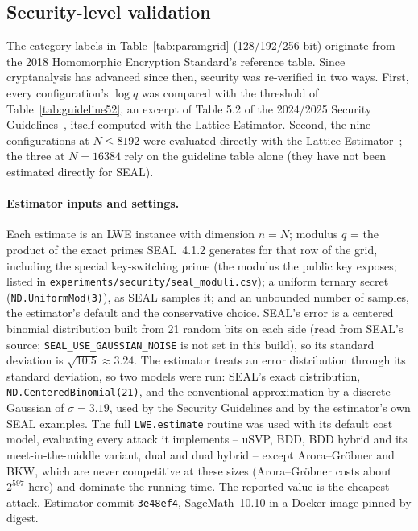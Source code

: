 \subsection{Security-level validation}
\label{sec:security-validation}

The category labels in Table~\ref{tab:paramgrid} (128/192/256-bit) originate from the 2018 Homomorphic Encryption Standard's reference table. Since cryptanalysis has advanced since then, security was re-verified in two ways. First, every configuration's $\log q$ was compared with the threshold of Table~\ref{tab:guideline52}, an excerpt of Table 5.2 of the 2024/2025 Security Guidelines~\cite{bossuat2024}, itself computed with the Lattice Estimator. Second, the nine configurations at $N \le 8192$ were evaluated directly with the Lattice Estimator~\cite{albrecht2015estimator}; the three at $N{=}16384$ rely on the guideline table alone (they have not been estimated directly for SEAL).

\paragraph{Estimator inputs and settings.}\sloppy{} Each estimate is an LWE instance with dimension $n = N$; modulus $q$ = the product of the exact primes SEAL~4.1.2 generates for that row of the grid, including the special key-switching prime (the modulus the public key exposes; listed in \nolinkurl{experiments/security/seal_moduli.csv}); a uniform ternary secret (\texttt{ND.UniformMod(3)}), as SEAL samples it; and an unbounded number of samples, the estimator's default and the conservative choice. SEAL's error is a centered binomial distribution built from 21 random bits on each side (read from SEAL's source; \texttt{SEAL\_USE\_GAUSSIAN\_NOISE} is not set in this build), so its standard deviation is $\sqrt{10.5} \approx 3.24$. The estimator treats an error distribution through its standard deviation, so two models were run: SEAL's exact distribution, \texttt{ND.CenteredBinomial(21)}, and the conventional approximation by a discrete Gaussian of $\sigma = 3.19$, used by the Security Guidelines and by the estimator's own SEAL examples. The full \texttt{LWE.estimate} routine was used with its default cost model, evaluating every attack it implements -- uSVP, BDD, BDD hybrid and its meet-in-the-middle variant, dual and dual hybrid -- except Arora--Gr\"obner and BKW, which are never competitive at these sizes (Arora--Gr\"obner costs about $2^{597}$ here) and dominate the running time. The reported value is the cheapest attack. Estimator commit \texttt{3e48ef4}, SageMath~10.10 in a Docker image pinned by digest.

